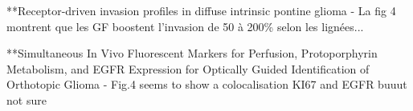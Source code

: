 \documentclass[11pt,a4paper]{article}
\begin{document}
**Receptor-driven invasion profiles in diffuse intrinsic pontine glioma
- La fig 4 montrent que les GF boostent l'invasion de 50 à  200\% selon les lignées...

**Simultaneous In Vivo Fluorescent Markers for Perfusion, Protoporphyrin Metabolism, and EGFR Expression for Optically Guided Identification of Orthotopic Glioma
- Fig.4 seems to show a colocalisation KI67 and EGFR buuut not sure
\end{document}
